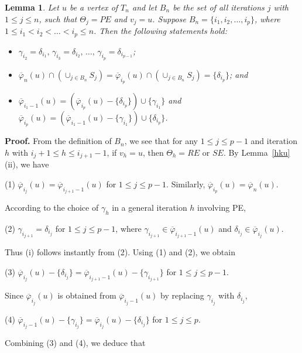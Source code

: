 \documentclass[11pt]{article}
\newtheorem{lemma}[theorem]{Lemma}
\newcommand{\phibar}{\overline{\varphi}}
\begin{document}
\begin{lemma}\label{uniquezang}
Let $u$ be a vertex of $T_n$ and let $B_{n}$ be the set of all iterations $j$ with $1\le j \le n$, such that $\Theta_j 
=PE$ and $v_j=u$. Suppose $B_{n}=\{i_1,i_2, \ldots, i_p\}$, where $1\le i_1<i_2< \ldots < i_p \le n$. 
Then the following statements hold:
\begin{itemize}
\vspace{-1mm}
\item[(i)] $\gamma_{i_2}=\delta_{i_1}, \, \gamma_{i_3}=\delta_{i_2},\, \ldots, \, \gamma_{i_p}=\delta_{i_{p-1}}$;
\vspace{-1mm}
\item[(ii)] $\phibar_{n}(u) \cap (\cup_{j \in B_{n}} S_j) =\phibar_{i_p}(u) \cap (\cup_{j \in B_{n}} S_j) = \{\delta_{i_p}\}$; and
\vspace{-1.5mm}
\item[(iii)] $\phibar_{i_1-1}(u)=(\phibar_{i_p}(u)-\{\delta_{i_p}\}) \cup \{\gamma_{i_1}\}$ and
$\phibar_{i_p}(u)=(\phibar_{i_1-1}(u)- \{\gamma_{i_1}\}) \cup \{\delta_{i_p}\}$. 
\end{itemize}
\end{lemma}

{\bf Proof.} From the definition of $B_{n}$, we see that for any $1\le j \le p-1$ and iteration $h$ with $i_j+1 \le h \le i_{j+1}-1$, 
if $v_h=u$, then $\Theta_h=RE$ or $SE$. By Lemma~\ref{hku}(ii), we have 

(1) $\phibar_{i_j}(u)=\phibar_{i_{j+1}-1}(u)$ for $1\le j \le p-1$. Similarly, $\phibar_{i_p}(u)=\phibar_{n}(u)$.

\noindent According to the choice of $\gamma_h$ in a general iteration $h$ involving PE,

(2) $\gamma_{i_{j+1}}=\delta_{i_j}$ for $1\le j \le p-1$, where $\gamma_{i_{j+1}} \in  \phibar_{i_{j+1}-1}(u)$ and $\delta_{i_j} \in \phibar_{i_j}(u)$. 
 
\noindent Thus (i) follows instantly from (2). Using (1) and (2), we obtain

(3) $\phibar_{i_j}(u)-\{\delta_{i_j}\}= \phibar_{i_{j+1}-1}(u)- \{\gamma_{i_{j+1}}\}$ for $1\le j \le p-1$. 

\noindent Since $\phibar_{i_j}(u)$ is obtained from $\phibar_{i_j-1}(u)$ by replacing $\gamma_{i_j}$ with $\delta_{i_j}$, 

(4) $\phibar_{i_j-1}(u)- \{\gamma_{i_j}\} = \phibar_{i_j}(u)-\{\delta_{i_j}\}$ for $1\le j \le p$. 
 
\noindent Combining (3) and (4), we deduce that 
\end{document}
